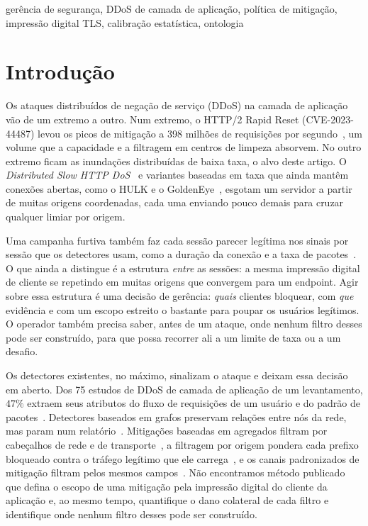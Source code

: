 \documentclass[conference,letterpaper,10pt]{IEEEtran}
\newcommand\1{\textit{(i)}}
\newcommand\2{\textit{(ii)}}
\newcommand\3{\textit{(iii)}}
\begin{document}
\begin{IEEEkeywords}
gerência de segurança, DDoS de camada de aplicação, política de mitigação, impressão digital TLS, calibração estatística, ontologia
\end{IEEEkeywords}

\section{Introdução}
\label{sec:intro}

Os ataques distribuídos de negação de serviço (DDoS) na camada de aplicação vão de um extremo a outro. Num extremo, o HTTP/2 Rapid Reset (CVE-2023-44487) levou os picos de mitigação a 398 milhões de requisições por segundo~\cite{google2023rapidreset}, um volume que a capacidade e a filtragem em centros de limpeza absorvem. No outro extremo ficam as inundações distribuídas de baixa taxa, o alvo deste artigo. O \textit{Distributed Slow HTTP DoS}~\cite{cambiaso2013slowdos} e variantes baseadas em taxa que ainda mantêm conexões abertas, como o HULK e o GoldenEye~\cite{sharafaldin2018cicids}, esgotam um servidor a partir de muitas origens coordenadas, cada uma enviando pouco demais para cruzar qualquer limiar por origem.

Uma campanha furtiva também faz cada sessão parecer legítima nos sinais por sessão que os detectores usam, como a duração da conexão e a taxa de pacotes~\cite{kemp2023approach}. O que ainda a distingue é a estrutura \textit{entre} as sessões: a mesma impressão digital de cliente se repetindo em muitas origens que convergem para um endpoint. Agir sobre essa estrutura é uma decisão de gerência: \textit{quais} clientes bloquear, com \textit{que} evidência e com um escopo estreito o bastante para poupar os usuários legítimos. O operador também precisa saber, antes de um ataque, onde nenhum filtro desses pode ser construído, para que possa recorrer ali a um limite de taxa ou a um desafio.

Os detectores existentes, no máximo, sinalizam o ataque e deixam essa decisão em aberto. Dos 75 estudos de DDoS de camada de aplicação de um levantamento, $47\%$ extraem seus atributos do fluxo de requisições de um usuário e do padrão de pacotes~\cite{odusami2020survey}. Detectores baseados em grafos preservam relações entre nós da rede, mas param num relatório~\cite{belcastro2025klage}. Mitigações baseadas em agregados filtram por cabeçalhos de rede e de transporte~\cite{mahajan2002pushback,alcoz2022accturbo}, a filtragem por origem pondera cada prefixo bloqueado contra o tráfego legítimo que ele carrega~\cite{soldo2012filtering}, e os canais padronizados de mitigação filtram pelos mesmos campos~\cite{dots2020data,rfc8955flowspec}. Não encontramos método publicado que defina o escopo de uma mitigação pela impressão digital do cliente da aplicação e, ao mesmo tempo, quantifique o dano colateral de cada filtro e identifique onde nenhum filtro desses pode ser construído.
\end{document}
